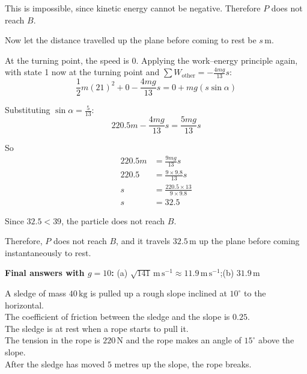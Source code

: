 \documentclass[leqno]{article}
\begin{document}
\begin{enumerate}[
  label=\textbf{\arabic*.},
  leftmargin=*,
  topsep=0pt,
  partopsep=0pt,
  parsep=0pt
]
\begin{djsSolution}
\begin{enumerate}[label=\textbf{(\alph*)}]
  This is impossible, since kinetic energy cannot be negative. Therefore $P$ does not reach $B$.

  Now let the distance travelled up the plane before coming to rest be $s\,\mathrm{m}$.

  At the turning point, the speed is $0$. Applying the work--energy principle again, with state 1 now at the turning point and $\sum W_{\text{other}}=-\frac{4mg}{13}s$:
  \[
  \frac12 m(21)^2+0-\frac{4mg}{13}s=0+mg(s\sin\alpha)
  \]

  Substituting $\sin\alpha=\frac{5}{13}$:
  \[
  220.5m-\frac{4mg}{13}s=\frac{5mg}{13}s
  \]

  So
  \begin{align*}
  220.5m &= \frac{9mg}{13}s \\
  220.5 &= \frac{9\times 9.8}{13}s \\
  s &= \frac{220.5\times 13}{9\times 9.8} \\
  s &= 32.5
  \end{align*}

  Since $32.5<39$, the particle does not reach $B$.

  Therefore, $P$ does not reach $B$, and it travels $32.5\,\mathrm{m}$ up the plane before coming instantaneously to rest.
\end{enumerate}
\par\medskip\noindent\textbf{Final answers with \(g = 10\):} (a) \(\sqrt{141}\,\mathrm{m\,s^{-1}}\approx 11.9\,\mathrm{m\,s^{-1}}\);\quad (b) \(31.9\,\mathrm{m}\)
\end{djsSolution}


\newpage

\questionitem

A sledge of mass $40\,\mathrm{kg}$ is pulled up a rough slope inclined at $10^\circ$ to the horizontal. \\

The coefficient of friction between the sledge and the slope is $0.25$. \\

The sledge is at rest when a rope starts to pull it. \\

The tension in the rope is $220\,\mathrm{N}$ and the rope makes an angle of $15^\circ$ above the slope. \\

After the sledge has moved $5$ metres up the slope, the rope breaks. \\


\end{enumerate}
\end{document}
